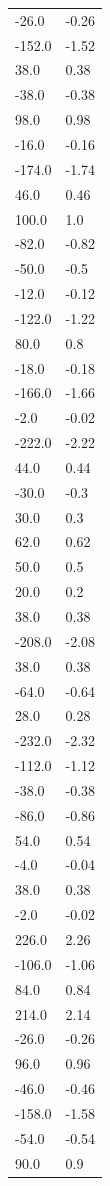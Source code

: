 \begin{longtable}{ll}
-26.0 & -0.26 \\
-152.0 & -1.52 \\
38.0 & 0.38 \\
-38.0 & -0.38 \\
98.0 & 0.98 \\
-16.0 & -0.16 \\
-174.0 & -1.74 \\
46.0 & 0.46 \\
100.0 & 1.0 \\
-82.0 & -0.82 \\
-50.0 & -0.5 \\
-12.0 & -0.12 \\
-122.0 & -1.22 \\
80.0 & 0.8 \\
-18.0 & -0.18 \\
-166.0 & -1.66 \\
-2.0 & -0.02 \\
-222.0 & -2.22 \\
44.0 & 0.44 \\
-30.0 & -0.3 \\
30.0 & 0.3 \\
62.0 & 0.62 \\
50.0 & 0.5 \\
20.0 & 0.2 \\
38.0 & 0.38 \\
-208.0 & -2.08 \\
38.0 & 0.38 \\
-64.0 & -0.64 \\
28.0 & 0.28 \\
-232.0 & -2.32 \\
-112.0 & -1.12 \\
-38.0 & -0.38 \\
-86.0 & -0.86 \\
54.0 & 0.54 \\
-4.0 & -0.04 \\
38.0 & 0.38 \\
-2.0 & -0.02 \\
226.0 & 2.26 \\
-106.0 & -1.06 \\
84.0 & 0.84 \\
214.0 & 2.14 \\
-26.0 & -0.26 \\
96.0 & 0.96 \\
-46.0 & -0.46 \\
-158.0 & -1.58 \\
-54.0 & -0.54 \\
90.0 & 0.9 \\

\end{longtable}
